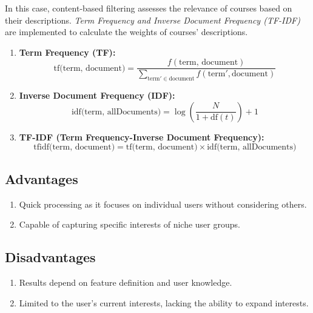 In this case, content-based filtering assesses the relevance of courses based on their descriptions. 
\textit{Term Frequency and Inverse Document Frequency (TF-IDF)}~\cite{tfidf} are implemented to calculate the weights of 
courses' descriptions.

\begin{enumerate}
  \item \textbf{Term Frequency (TF):}
  \begin{equation}
    \text{tf(term, document)} = \frac{f(\text{term, document})}{\sum_{\text{term}' \in \text{document}} f(\text{term}', \text{document})}
  \end{equation}
  \item \textbf{Inverse Document Frequency (IDF):}
  \begin{equation}
    \text{idf(term, allDocuments)} = \log \left( \frac{N}{1 + \text{df}(t)} \right) + 1
  \end{equation}
  \item \textbf{TF-IDF (Term Frequency-Inverse Document Frequency):}
  \begin{equation}
    \text{tfidf(term, document)} = \text{tf(term, document)} \times \text{idf(term, allDocuments)}
  \end{equation}
\end{enumerate}

\subsection{Advantages}
\begin{enumerate}
  \item \textsf{Quick processing as it focuses on individual users without considering others.}
  \item \textsf{Capable of capturing specific interests of niche user groups.}
\end{enumerate}

\subsection{Disadvantages}
\begin{enumerate}
  \item \textsf{Results depend on feature definition and user knowledge.}
  \item \textsf{Limited to the user's current interests, lacking the ability to expand interests.}
\end{enumerate}

